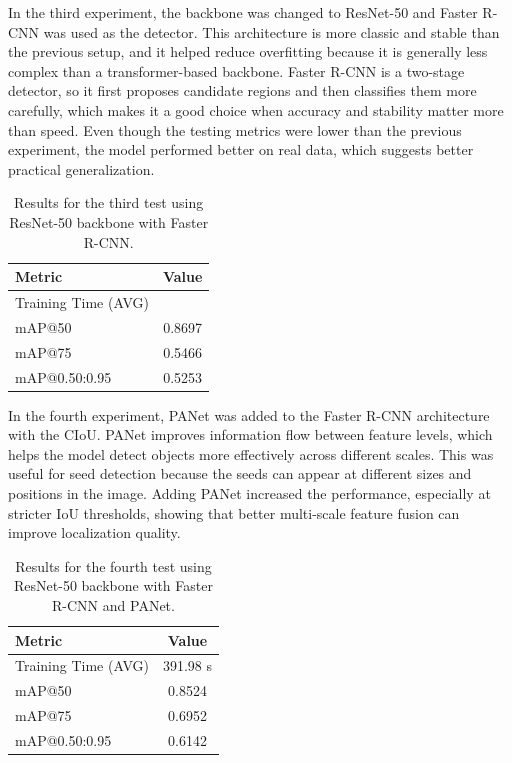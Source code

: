 In the third experiment, the backbone was changed to ResNet-50 and Faster R-CNN was used as the detector. This architecture is more classic and stable than the previous setup, and it helped reduce overfitting because it is generally less complex than a transformer-based backbone. Faster R-CNN is a two-stage detector, so it first proposes candidate regions and then classifies them more carefully, which makes it a good choice when accuracy and stability matter more than speed. Even though the testing metrics were lower than the previous experiment, the model performed better on real data, which suggests better practical generalization.

\begin{table}[h]
\centering
\begin{tabular}{l c}
\hline
Metric & Value \\
\hline
Training Time (AVG) &  \\
mAP@50 & 0.8697 \\
mAP@75 & 0.5466 \\
mAP@0.50:0.95 & 0.5253 \\
\hline
\end{tabular}
\caption{Results for the third test using ResNet-50 backbone with Faster R-CNN.}
\label{tab:third_test}
\end{table}

In the fourth experiment, PANet was added to the Faster R-CNN architecture with the CIoU. PANet improves information flow between feature levels, which helps the model detect objects more effectively across different scales. This was useful for seed detection because the seeds can appear at different sizes and positions in the image. Adding PANet increased the performance, especially at stricter IoU thresholds, showing that better multi-scale feature fusion can improve localization quality.

\begin{table}[h]
\centering
\begin{tabular}{l c}
\hline
Metric & Value \\
\hline
Training Time (AVG) & 391.98 s \\
mAP@50 & 0.8524 \\
mAP@75 & 0.6952 \\
mAP@0.50:0.95 & 0.6142 \\
\hline
\end{tabular}
\caption{Results for the fourth test using ResNet-50 backbone with Faster R-CNN and PANet.}
\label{tab:fourth_test}
\end{table}
